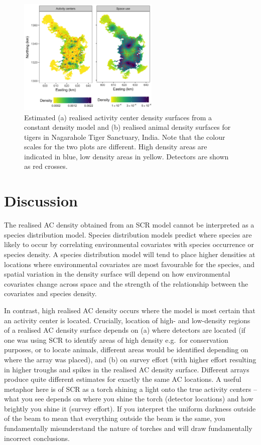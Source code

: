 \documentclass[10pt,a4paper]{article}
\begin{document}
\begin{figure}[htbp]
\centering
\includegraphics[width=0.6\textwidth]{tiger_spaceuse.png}
\caption{Estimated (a) realised activity center density surfaces from a constant density model and (b) realised animal density surfaces for tigers in Nagarahole Tiger Sanctuary, India. Note that the colour scales for the two plots are different. High density areas are indicated in blue, low density areas in yellow. Detectors are shown as red crosses.}
\label{tigerspaceuse}
\end{figure}


\section{Discussion} \label{discussion}
The realised AC density obtained from an SCR model cannot be interpreted as a species distribution model. Species distribution models predict where species are likely to occur by correlating environmental covariates with species occurrence or species density. %
A species distribution model will tend to place higher densities at locations where environmental covariates are most favourable for the species, and spatial variation in the density surface will depend on how environmental covariates change across space and the strength of the relationship between the covariates and species density.

In contrast, high realised AC density occurs where the model is most certain that an activity center is located. Crucially, location of high- and low-density regions of a realised AC density surface depends on (a) where detectors are located (if one was using SCR to identify areas of high density e.g.\ for conservation purposes, or to locate animals, different areas would be identified depending on where the array was placed), and (b) on survey effort (with higher effort resulting in higher troughs and spikes in the realised AC density surface. Different arrays produce quite different estimates for exactly the same AC locations. A useful metaphor here is of SCR as a torch shining a light onto the true activity centers -- what you see depends on where you shine the torch (detector locations) and how brightly you shine it (survey effort). If you interpret the uniform darkness outside of the beam to mean that everything outside the beam is the same, you fundamentally misunderstand the nature of torches and will draw fundamentally incorrect conclusions.
\end{document}

